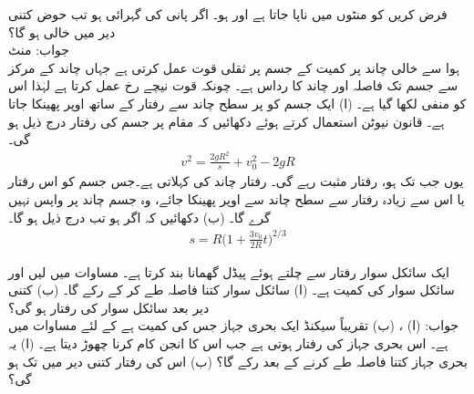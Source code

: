 فرض کریں  کو منٹوں میں ناپا جاتا ہے اور  ہو۔  اگر پانی کی گہرائی  ہو تب حوض کتنی دیر میں  خالی ہو گا؟ \\
جواب:\quad {} منٹ
\\
ہوا سے خالی چاند پر کمیت  کے جسم پر ثقلی قوت  عمل کرتی ہے جہاں  چاند کے مرکز سے جسم تک فاصلہ  اور چاند کا رداس  ہے۔ چونکہ قوت  نیچے رخ عمل کرتا ہے لہٰذا اس کو  منفی لکھا گیا ہے۔ (ا) ایک جسم کو  پر سطح چاند سے   رفتار کے ساتھ اوپر پھینکا جاتا ہے۔ قانون نیوٹن  استعمال کرتے ہوئے  دکھائیں کہ مقام  پر جسم کی رفتار درج ذیل ہو گی۔
\begin{align*}
v^2=\frac{2gR^2}{s}+v_0^2-2gR
\end{align*} 
یوں جب تک  ہو، رفتار مثبت رہے گی۔ رفتار  چاند کی  کہلاتی ہے۔جس جسم کو  اس رفتار یا اس سے زیادہ رفتار سے سطح چاند سے اوپر پھینکا جائے، وہ جسم چاند پر واپس نہیں گرے گا۔ (ب) دکھائیں کہ اگر  ہو تب درج ذیل ہو گا۔
\begin{align*}
s=R\big(1+\frac{3v_0}{2R}t\big)^{2/3}
\end{align*} 

ایک سائکل سوار  رفتار سے چلتے ہوئے پیڈل گھمانا بند کرتا ہے۔ مساوات  میں  لیں اور سائکل سوار کی کمیت  ہے۔  (ا) سائکل سوار  کتنا فاصلہ طے کر کے رکے گا۔ (ب) کتنی دیر بعد سائکل سوار کی رفتار  ہو گی؟\\
جواب:\quad
(ا) ، (ب) تقریباً  سیکنڈ
ایک بحری جہاز جس کی کمیت  ہے کے لئے  مساوات  میں  ہے۔ اس بحری جہاز کی رفتار  ہوتی ہے جب اس کا انجن کام کرنا چھوڑ دیتا ہے۔ (ا) یہ بحری جہاز کتنا فاصلہ طے کرنے کے بعد رکے گا؟ (ب) اس کی رفتار کتنی دیر میں  تک ہو گی؟

